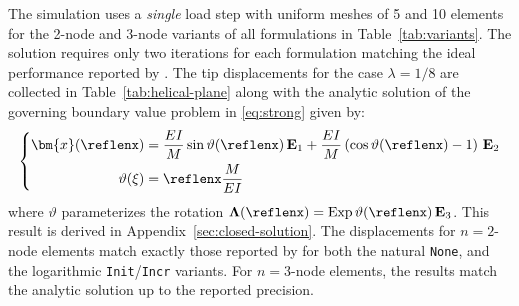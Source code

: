 The simulation uses a \emph{single} load step with uniform meshes of 5 and 10 elements for the  2-node and 3-node
variants of all formulations in Table~\ref{tab:variants}. 
%
The solution requires only two iterations for each formulation matching the ideal performance reported by \cite{simo1986threedimensional}.
The tip displacements for the case \(\lambda = 1/8\) are collected in Table~\ref{tab:helical-plane} along with
the analytic solution of the governing boundary value problem in \eqref{eq:strong} given by:
\begin{equation*}
  \left\{
  \begin{aligned}
  \bm{x}(\reflenx)&=\frac{EI}{M} \sin \vartheta(\reflenx) \, \mathbf{E}_1
                      + \frac{EI}{M}\left(\cos \vartheta(\reflenx)-1\right) \, \mathbf{E}_2 \\
    \vartheta(\xi)   &=  \reflenx \frac{M}{EI}
  \end{aligned}
  \right.
\end{equation*}
%
where \(\vartheta\) parameterizes the rotation \(\boldsymbol{\Lambda}(\reflenx) = \operatorname{Exp} \vartheta(\reflenx) \, \mathbf{E}_3\). This result is derived in Appendix~\ref{sec:closed-solution}. 
The displacements for \(n=2\)-node elements match exactly those reported by \cite{ibrahimbegović1995computational} for both the natural \texttt{None}, and the logarithmic \texttt{Init}/\texttt{Incr} variants.
For \(n=3\)-node elements, the results match the analytic solution up to the reported precision.
%
%
\begin{center}
\begin{table}[H]%
  \caption{Tip displacements for the helical cantilever beam under $\lambda = 1/8$ for a discretization with 10 \(n\)-node elements.}
\label{tab:helical-plane}

\end{table}
\end{center}
%
%
